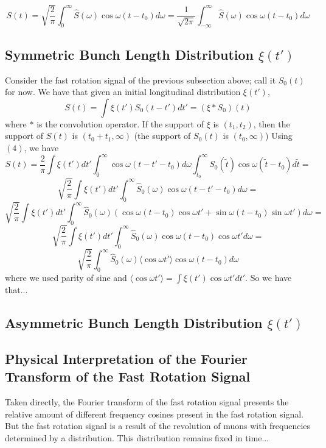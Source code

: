 \begin{equation}
S(t)=\sqrt{\frac{2}{\pi}}\int^{\infty}_0\hat{S}(\omega)\cos\omega(t-t_0)d\omega=\frac{1}{\sqrt{2\pi}}\int^{\infty}_{-\infty}\hat{S}(\omega)\cos\omega(t-t_0)d\omega
\end{equation}

\subsection{Symmetric Bunch Length Distribution $\xi(t')$}
Consider the fast rotation signal of the previous subsection above; call it $S_0(t)$ for now. We have that given an initial longitudinal distribution $\xi(t')$, \[S(t)=\int\xi(t')S_0(t-t')dt'=(\xi\ast S_0)(t)\] where $\ast$ is the convolution operator. If the support of $\xi$ is $(t_1,t_2)$, then the support of $S(t)$ is $(t_0+t_1,\infty)$ (the support of $S_0(t)$ is $(t_0,\infty)$) Using $(4)$, we have \[S(t)=\frac{2}{\pi}\int\xi(t')dt'\int^{\infty}_0\cos\omega(t-t'-t_0)d\omega\int^{\infty}_{t_0}S_0(\tilde{t})\cos\omega(\tilde{t}-t_0)d\tilde{t}=\]\[\sqrt{\frac{2}{\pi}}\int\xi(t')dt'\int^{\infty}_0\hat{S}_0(\omega)\cos\omega(t-t'-t_0)d\omega=\]\[\sqrt{\frac{2}{\pi}}\int\xi(t')dt'\int^{\infty}_0\hat{S}_0(\omega)(\cos\omega(t-t_0)\cos\omega t'+\sin\omega(t-t_0)\sin\omega t')d\omega=\]\[\sqrt{\frac{2}{\pi}}\int\xi(t')dt'\int^{\infty}_0\hat{S}_0(\omega)\cos\omega(t-t_0)\cos\omega t'd\omega=\]\[\sqrt{\frac{2}{\pi}}\int^{\infty}_0\hat{S}_0(\omega)\langle\cos\omega t'\rangle\cos\omega(t-t_0)d\omega\] where we used parity of sine and $\langle\cos\omega t'\rangle=\int\xi(t')\cos\omega t'dt'$. So we have that...

\subsection{Asymmetric Bunch Length Distribution $\xi(t')$}

\subsection{Physical Interpretation of the Fourier Transform of the Fast Rotation Signal}

Taken directly, the Fourier transform of the fast rotation signal presents the relative amount of different frequency cosines present in the fast rotation signal. But the fast rotation signal is a result of the revolution of muons with frequencies determined by a distribution. This distribution remains fixed in time...

